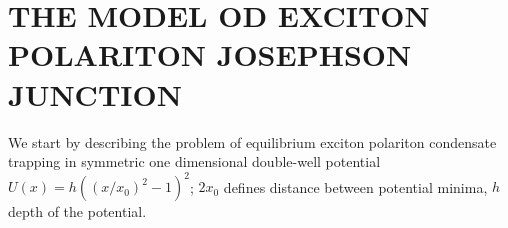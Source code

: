 \documentclass[aps, pre, preprint, groupedaddress, superscriptaddress, showkeys, showpacs] {revtex4-1}
\begin{document}
\section{THE MODEL OD EXCITON POLARITON JOSEPHSON JUNCTION \label{sec:model}}

We start by describing the problem of equilibrium exciton polariton condensate trapping in symmetric one dimensional double-well potential $U(x) = h ((x/x_0)^2 - 1)^2$; $2x_0$ defines distance between potential minima, $h$ depth of the potential.
% 
\end{document}
